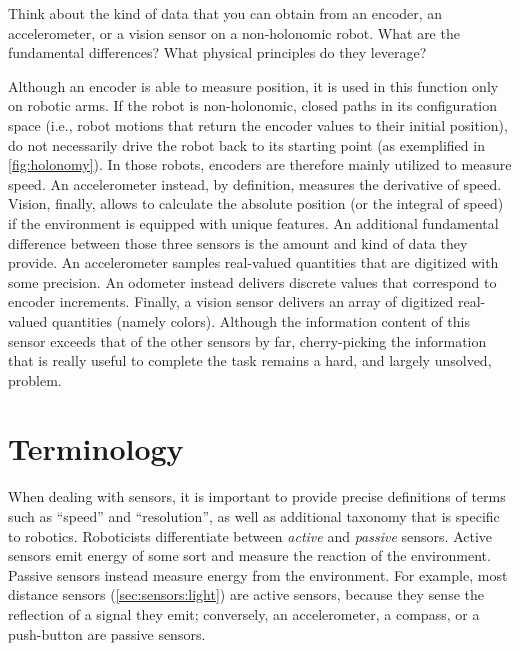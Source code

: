 \begin{mdframed}
Think about the kind of data that you can obtain from an encoder, an accelerometer, or a vision sensor on a non-holonomic robot. What are the fundamental differences? What physical principles do they leverage?
\end{mdframed}

Although an encoder is able to measure position, it is used in this function only on robotic arms. If the robot is non-holonomic, closed paths in its configuration space (i.e., robot motions that return the encoder values to their initial position), do not necessarily drive the robot back to its starting point (as exemplified in \cref{fig:holonomy}).
In those robots, encoders are therefore mainly utilized to measure speed. An accelerometer instead, by definition, measures the derivative of speed. Vision, finally, allows to calculate the absolute position (or the integral of speed) if the environment is equipped with unique features. An additional fundamental difference between those three sensors is the amount and kind of data they provide. An accelerometer samples real-valued quantities that are digitized with some precision. An odometer instead delivers discrete values that correspond to encoder increments. Finally, a vision sensor delivers an array of digitized real-valued quantities (namely colors). Although the information content of this sensor exceeds that of the other sensors by far, cherry-picking the information that is really useful to complete the task remains a hard, and largely unsolved, problem.

\section{Terminology}\label{sec:sensors:terminology}

When dealing with sensors, it is important to provide precise definitions of terms such as ``speed'' and ``resolution'', as well as additional taxonomy that is specific to robotics.
%
Roboticists differentiate between \textsl{active} and \textsl{passive} sensors. Active sensors  emit energy of some sort and measure the reaction of the environment. Passive sensors  instead measure energy from the environment. For example, most distance sensors (\cref{sec:sensors:light}) are active sensors, because they sense the reflection of a signal they emit; conversely, an accelerometer, a compass, or a push-button are passive sensors.

